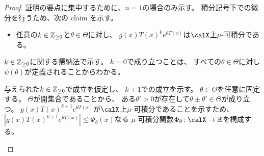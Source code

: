 \documentclass[report]{jlreq}
\begin{document}
\begin{proof}
    証明の要点に集中するために、$n = 1$の場合のみ示す。
    積分記号下での微分を行うため、次の claim を示す。
    \begin{itemize}
        \item 任意の$k \in \mathbb{Z}_{\ge 0}$と$\theta \in \Theta$に対し、
            $g(x) T(x)^k e^{\theta T(x)}$は$\calX$上$\mu$-可積分である。
    \end{itemize}
    \begin{innerproof}
        $k \in \mathbb{Z}_{\ge 0}$に関する帰納法で示す。
        $k = 0$で成り立つことは、
        すべての$\theta \in \Theta$に対し
        $\psi(\theta)$が定義されることからわかる。

        与えられた$k \in \mathbb{Z}_{\ge 0}$で成立を仮定し、
        $k + 1$での成立を示す。
        $\theta \in \Theta$を任意に固定する。
        $\Theta$が開集合であることから、
        ある$\theta' > 0$が存在して$\theta \pm \theta' \in \Theta$が成り立つ。
        $g(x) T(x)^{k + 1} e^{\theta T(x)}$が$\calX$上$\mu$-可積分であることを示すため、
        $|g(x) T(x)^{k + 1} e^{\theta T(x)}| \le \Phi_\theta(x)$なる
        $\mu$-可積分関数$\Phi_\theta \colon \calX \to \R$を構成する。


\end{innerproof}
\end{proof}
\end{document}
